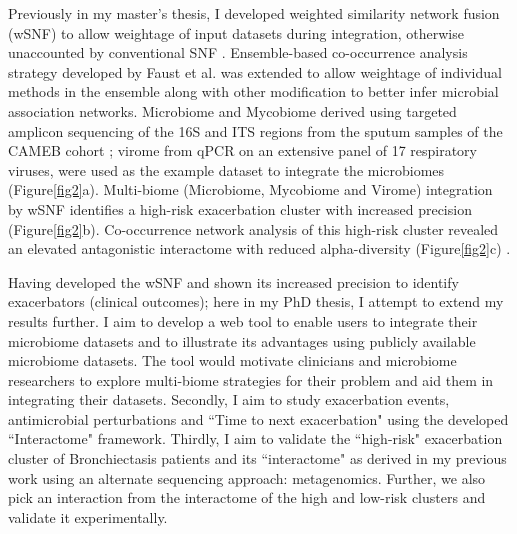 Previously in my master's thesis, I developed weighted similarity network fusion (wSNF) to allow weightage of input datasets during integration, otherwise unaccounted by conventional SNF \cite{Wang2014}. Ensemble-based co-occurrence analysis strategy developed by Faust et al. \cite{Faust2012} was extended to allow weightage of individual methods in the ensemble along with other modification to better infer microbial association networks. Microbiome and Mycobiome derived using targeted amplicon sequencing of the 16S and ITS regions from the sputum samples of the CAMEB cohort \cite{Mac1800766}; virome from qPCR on an extensive panel of 17 respiratory viruses, were used as the example dataset to integrate the microbiomes (Figure\ref{fig2}a). Multi-biome (Microbiome, Mycobiome and Virome) integration by wSNF identifies a high-risk exacerbation cluster with increased precision (Figure\ref{fig2}b). Co-occurrence network analysis of this high-risk cluster revealed an elevated antagonistic interactome with reduced alpha-diversity (Figure\ref{fig2}c) \cite{Narayana2019}.

Having developed the wSNF and shown its increased precision to identify exacerbators (clinical outcomes); here in my PhD thesis, I attempt to extend my results further. I aim to develop a web tool to enable users to integrate their microbiome datasets and to illustrate its advantages using publicly available microbiome datasets. The tool would motivate clinicians and microbiome researchers to explore multi-biome strategies for their problem and aid them in integrating their datasets. Secondly, I aim to study exacerbation events, antimicrobial perturbations and ``Time to next exacerbation" using the developed ``Interactome" framework. Thirdly, I aim to validate the ``high-risk" exacerbation cluster of Bronchiectasis patients and its ``interactome" as derived in my previous work \cite{Narayana2019} using an alternate sequencing approach: metagenomics. Further, we also pick an interaction from the interactome of the high and low-risk clusters and validate it experimentally. 